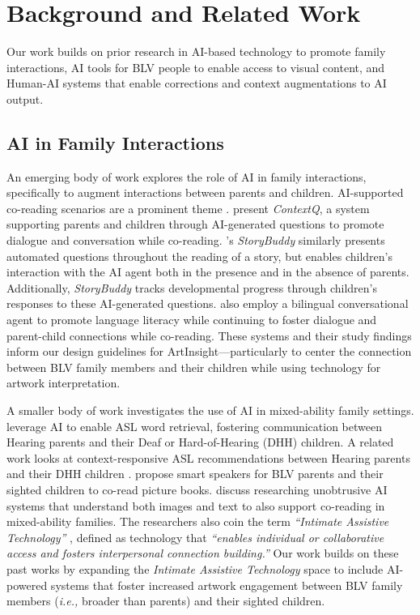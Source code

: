 \section{Background and Related Work}
Our work builds on prior research in AI-based technology to promote family interactions, AI tools for BLV people to enable access to visual content, and Human-AI systems that enable corrections and context augmentations to AI output. 

\subsection{AI in Family Interactions}
An emerging body of work explores the role of AI in family interactions, specifically to augment interactions between parents and children. AI-supported co-reading scenarios are a prominent theme \cite{Zhang_StoryBuddy, Dietz_ContextQ, Lin_FishScales, Xu_Bilingual}. \citet{Dietz_ContextQ} present \textit{ContextQ}, a system supporting parents and children through AI-generated questions to promote dialogue and conversation while co-reading. \citet{Zhang_StoryBuddy}'s \textit{StoryBuddy} similarly presents automated questions throughout the reading of a story, but enables children's interaction with the AI agent both in the presence and in the absence of parents. Additionally, \textit{StoryBuddy} tracks developmental progress through children's responses to these AI-generated questions. \citet{Xu_Bilingual} also employ a bilingual conversational agent to promote language literacy while continuing to foster dialogue and parent-child connections while co-reading. These systems and their study findings inform our design guidelines for ArtInsight---particularly to center the connection between BLV family members and their children while using technology for artwork interpretation.

A smaller body of work investigates the use of AI in mixed-ability family settings. \citet{ASL_DeafChild_HearingParent} leverage AI to enable ASL word retrieval, fostering communication between Hearing parents and their Deaf or Hard-of-Hearing (DHH) children. A related work looks at context-responsive ASL recommendations between Hearing parents and their DHH children \cite{Hossain_ContextResponsiveASL}. \citet{Park_AllAboutPictures_2023} propose smart speakers for BLV parents and their sighted children to co-read picture books. \citet{cuddlingup} discuss researching unobtrusive AI systems that understand both images and text to also support co-reading in mixed-ability families. The researchers also coin the term \textit{``Intimate Assistive Technology''} \cite{cuddlingup}, defined as technology that \textit{``enables individual or collaborative access and fosters interpersonal connection building.''} Our work builds on these past works by expanding the \textit{Intimate Assistive Technology} space to include AI-powered systems that foster increased artwork engagement between BLV family members (\textit{i.e.,} broader than parents) and their sighted children.

